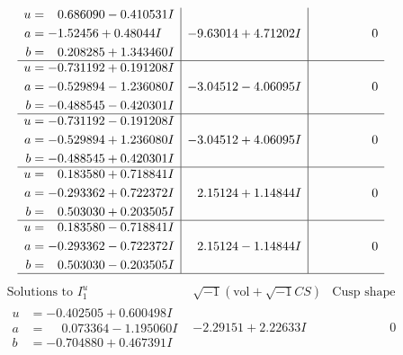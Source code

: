 \documentclass[1p]{elsarticle_modified}
\theoremstyle{definition}
\newcommand{\I}{\sqrt{-1}}
\begin{document}
$$\begin{array}{c|c|c}
\begin{aligned}
u &= \phantom{-}0.686090 - 0.410531 I \\
a &= -1.52456 + 0.48044 I \\
b &= \phantom{-}0.208285 + 1.343460 I\end{aligned}
 & -9.63014 + 4.71202 I & \phantom{-0.000000 } 0 \\ \hline\begin{aligned}
u &= -0.731192 + 0.191208 I \\
a &= -0.529894 - 1.236080 I \\
b &= -0.488545 - 0.420301 I\end{aligned}
 & -3.04512 - 4.06095 I & \phantom{-0.000000 } 0 \\ \hline\begin{aligned}
u &= -0.731192 - 0.191208 I \\
a &= -0.529894 + 1.236080 I \\
b &= -0.488545 + 0.420301 I\end{aligned}
 & -3.04512 + 4.06095 I & \phantom{-0.000000 } 0 \\ \hline\begin{aligned}
u &= \phantom{-}0.183580 + 0.718841 I \\
a &= -0.293362 + 0.722372 I \\
b &= \phantom{-}0.503030 + 0.203505 I\end{aligned}
 & \phantom{-}2.15124 + 1.14844 I & \phantom{-0.000000 } 0 \\ \hline\begin{aligned}
u &= \phantom{-}0.183580 - 0.718841 I \\
a &= -0.293362 - 0.722372 I \\
b &= \phantom{-}0.503030 - 0.203505 I\end{aligned}
 & \phantom{-}2.15124 - 1.14844 I & \phantom{-0.000000 } 0\\
 \hline 
 \end{array}$$\newpage$$\begin{array}{c|c|c}  
\text{Solutions to }I^u_{1}& \I (\text{vol} + \sqrt{-1}CS) & \text{Cusp shape}\\
 \hline 
\begin{aligned}
u &= -0.402505 + 0.600498 I \\
a &= \phantom{-}0.073364 - 1.195060 I \\
b &= -0.704880 + 0.467391 I\end{aligned}
 & -2.29151 + 2.22633 I & \phantom{-0.000000 } 0 \\ \hline\begin{aligned}

\end{aligned}
\end{array}$$
\end{document}

